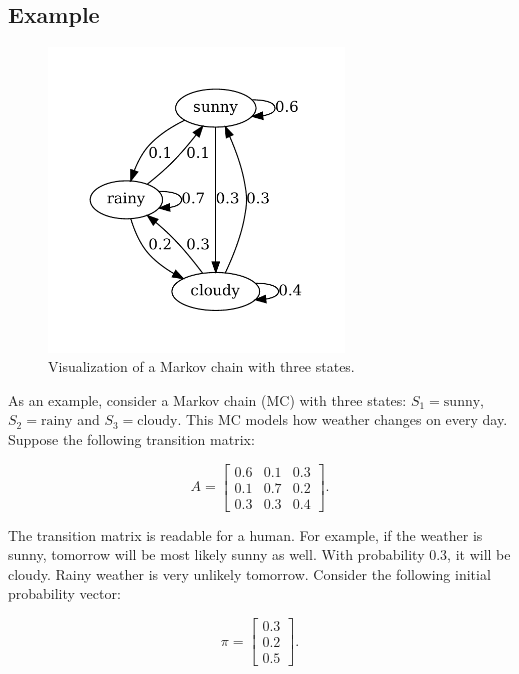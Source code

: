 \documentclass[thesis=B,english]{FITthesis}[2012/06/26]
\begin{document}
\subsection{Example}

\begin{figure}
	\centering
 	\includegraphics[width=0.7\textwidth]{mc}
 	\caption{Visualization of a Markov chain with three states.}
 	\label{fig:mc}
\end{figure}

As an example, consider a Markov chain (MC) with three states: $S_1 = \text{sunny}$, $S_2 = \text{rainy}$ and $S_3 = \text{cloudy}$. This MC models how weather changes on every day. Suppose the following transition matrix:

\begin{equation*}
A =
\begin{bmatrix}
	0.6	& 0.1 & 0.3 \\
	0.1 & 0.7 & 0.2 \\
	0.3 & 0.3 & 0.4
\end{bmatrix}.
\end{equation*}

The transition matrix is readable for a human. For example, if the weather is sunny, tomorrow will be most likely sunny as well. With probability 0.3, it will be cloudy. Rainy weather is very unlikely tomorrow. Consider the following initial probability vector:

\begin{equation*}
\pi = \begin{bmatrix} 0.3 \\ 0.2 \\ 0.5 \end{bmatrix}.
\end{equation*}
\end{document}
